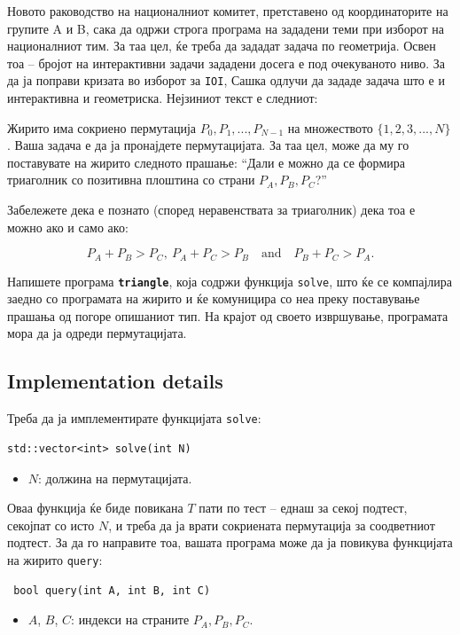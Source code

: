 \documentclass[12pt]{article}
\begin{document}
\renewcommand{\headerLang}{Македонски}
\renewcommand{\problemName}{AB23. ТРИАГОЛНИК}

\renewcommand{\headerLeft}{IATI Ден 2, сениорска група}
\renewcommand{\headerRightFirst}{XVII МЕЃУНАРОДЕН НАПРЕДЕН ТУРНИР ПО ИНФОРМАТИКА}
\renewcommand{\headerRightSecond}{ОНЛАЈН 2026}

\renewcommand{\tl}{$10$ сек.}
\renewcommand{\ml}{$1024$ MB}
\problem{Задача \problemName}

Новото раководство на националниот комитет, претставено од координаторите на групите A и B, сака да одржи строга програма на зададени теми при изборот на националниот тим. За таа цел, ќе треба да зададат задача по геометрија. Освен тоа -- бројот на интерактивни задачи зададени досега е под очекуваното ниво. За да ја поправи кризата во изборот за \texttt{IOI}, Сашка одлучи да зададе задача што е и интерактивна и геометриска. Нејзиниот текст е следниот:

Жирито има сокриено пермутација $P_0,P_1,...,P_{N-1}$ на множеството $\{1,2,3,...,N\}$. Ваша задача е да ја пронајдете пермутацијата. За таа цел, може да му го поставувате на жирито следното прашање: ``Дали е можно да се формира триаголник со позитивна плоштина со страни $P_A,P_B,P_C$?''

Забележете дека е познато (според неравенствата за триаголник) дека тоа е можно ако и само ако:

\[P_A + P_B > P_C,\ P_A + P_C > P_B \quad \text{and} \quad P_B + P_C > P_A.\]

Напишете програма \textbf{\texttt{triangle}}, која содржи функција \texttt{solve}, што ќе се компајлира заедно со програмата на жирито и ќе комуницира со неа преку поставување прашања од погоре опишаниот тип. На крајот од своето извршување, програмата мора да ја одреди пермутацијата.

\subsection{Implementation details}
Треба да ја имплементирате функцијата \texttt{solve}:
\begin{lstlisting}
std::vector<int> solve(int N)
\end{lstlisting}
\begin{itemize}
	\item $N$: должина на пермутацијата.
\end{itemize}

Оваа функција ќе биде повикана $T$ пати по тест -- еднаш за секој подтест, секојпат со исто $N$, и треба да ја врати сокриената пермутација за соодветниот подтест. За да го направите тоа, вашата програма може да ја повикува функцијата на жирито \texttt{query}:
\begin{lstlisting}
 bool query(int A, int B, int C)
\end{lstlisting}
\begin{itemize}
	\item $A$, $B$, $C$: индекси на страните $P_A, P_B, P_C$.
\end{itemize}
\end{document}
